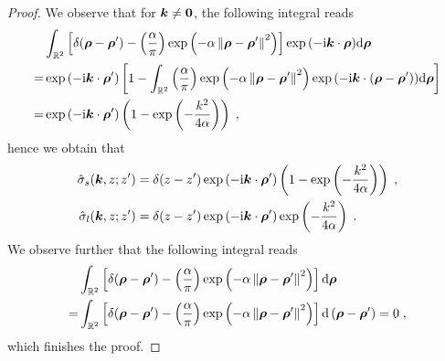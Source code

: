 \begin{proof}
We observe that for $\bm{k}\neq\bm{0}$, the following integral reads %
\begin{align*}
 & \int_{\mathbb{R}^2}\left[\delta(\bm{\rho}-\bm{\rho}^\prime)- {\left( \frac{\alpha}{\pi} \right)} \exp{\left(-\alpha \left\lVert\bm{\rho}-\bm{\rho}^\prime\right\rVert^2\right)}\right] \exp{(-\mathrm{i} \boldsymbol{k} \cdot \boldsymbol{\rho})} \mathrm{d} \bm{\rho} \\
 =&\exp{(-\mathrm{i} \boldsymbol{k} \cdot \boldsymbol{\rho}^\prime)}\left[1-  \int_{\mathbb{R}^2}{\left( \frac{\alpha}{\pi} \right)} \exp{\left(-\alpha \left\lVert\bm{\rho}-\bm{\rho}^\prime\right\rVert^2\right)}  \exp{(-\mathrm{i} \boldsymbol{k} \cdot (\boldsymbol{\rho}-\bm{\rho}^\prime))} \mathrm{d} \bm{\rho}\right]\\
 =&\exp{(-\mathrm{i} \boldsymbol{k} \cdot \boldsymbol{\rho}^\prime)}\left(1-\exp\left(-\frac{k^2}{4\alpha}\right)\right)\;,
\end{align*}
hence we obtain that 
\begin{align*}
 \Hat{\sigma}_{s}(\bm{k},z;z^\prime) &= \delta(z-z^\prime) \exp{(-\mathrm{i} \boldsymbol{k} \cdot \boldsymbol{\rho}^\prime)}\left(1-\exp\left(-\frac{k^2}{4\alpha}\right)\right)\;,  \\
 \Hat{\sigma}_{l}(\bm{k},z;z^\prime) &= \delta(z-z^\prime) \exp{(-\mathrm{i} \boldsymbol{k} \cdot \boldsymbol{\rho}^\prime)}\exp\left(-\frac{k^2}{4\alpha}\right)\;.
\end{align*}
We observe further that the following integral reads
\begin{align*}
 & \int_{\mathbb{R}^2}\left[\delta(\bm{\rho}-\bm{\rho}^\prime)- {\left( \frac{\alpha}{\pi} \right)} \exp{\left(-\alpha \left\lVert\bm{\rho}-\bm{\rho}^\prime\right\rVert^2\right)}\right]  \mathrm{d} \bm{\rho} \\
 =&\int_{\mathbb{R}^2}\left[\delta(\bm{\rho}-\bm{\rho}^\prime)- {\left( \frac{\alpha}{\pi} \right)} \exp{\left(-\alpha \left\lVert\bm{\rho}-\bm{\rho}^\prime\right\rVert^2\right)}\right]  \mathrm{d} \left(\bm{\rho}-\bm{\rho}^\prime\right) =0\;,
\end{align*}
which finishes the proof.
\end{proof}
